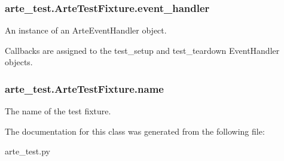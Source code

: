 \subsubsection[{event\+\_\+handler}]{\setlength{\rightskip}{0pt plus 5cm}arte\+\_\+test.\+Arte\+Test\+Fixture.\+event\+\_\+handler}\label{classarte__test_1_1_arte_test_fixture_acbd27814c30171ebeb3bc3b0dd2d7978}


An instance of an Arte\+Event\+Handler object. 

Callbacks are assigned to the test\+\_\+setup and test\+\_\+teardown Event\+Handler objects. 
\subsubsection[{name}]{\setlength{\rightskip}{0pt plus 5cm}arte\+\_\+test.\+Arte\+Test\+Fixture.\+name}\label{classarte__test_1_1_arte_test_fixture_abe682da10ac998fb93aa256004362abb}


The name of the test fixture. 



The documentation for this class was generated from the following file\+:\begin{DoxyCompactItemize}
\item 
arte\+\_\+test.\+py\end{DoxyCompactItemize}
